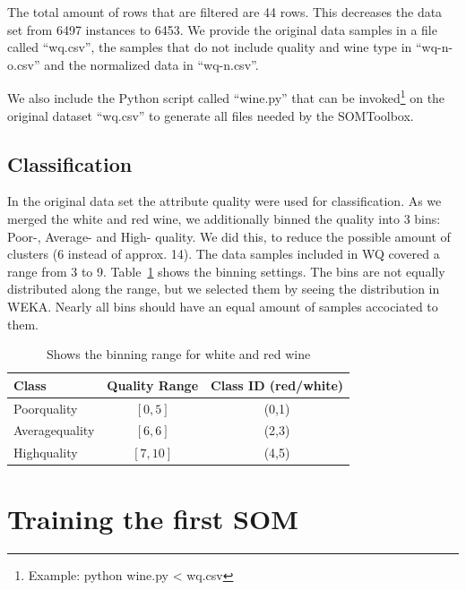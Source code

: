 \documentclass{acm_proc_article-sp}
\begin{document}
The total amount of rows that are filtered are 44 rows. This decreases the data set from 6497 instances to 6453.
We provide the original data samples in a file called ``wq.csv'', the samples that do not include quality and wine type
in ``wq-n-o.csv'' and the normalized data in ``wq-n.csv''.

We also include the Python script called ``wine.py'' that can be invoked\footnote{Example: python wine.py < wq.csv} on the original dataset ``wq.csv'' to generate all files needed by the SOMToolbox.

\subsection{Classification}

In the original data set the attribute quality were used for classification. As we merged the white and red wine,
we additionally binned the quality into 3 bins: Poor-, Average- and High- quality. We did this, to reduce the possible
amount of clusters (6 instead of approx. 14).
The data samples included in WQ covered a range from 3 to 9. Table~\ref{tab:quality-binning} shows the binning settings.
The bins are not equally distributed along the range, but we selected them by seeing the distribution in WEKA. Nearly
all bins should have an equal amount of samples accociated to them.

\begin{table}
\centering
\begin{tabular}{l|c|c}
    Class & Quality Range & Class ID (red/white)\\
    \hline
    \hline
    Poorquality & $[0,5]$ & (0,1) \\
    \hline
    Averagequality & $[6,6]$ & (2,3) \\
    \hline
    Highquality & $[7,10]$ & (4,5) \\
    \hline
\end{tabular}
\caption{Shows the binning range for white and red wine}
\label{tab:quality-binning}
\end{table}

\section{Training the first SOM}
\end{document}
